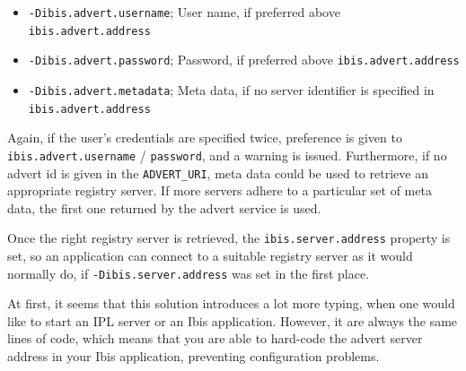\begin{itemize}
  \item \texttt{-Dibis.advert.username}; User name, if preferred above
  	\texttt{ibis.advert.address}
  \item \texttt{-Dibis.advert.password}; Password, if preferred above
  	\texttt{ibis.advert.address} 
  \item \texttt{-Dibis.advert.metadata}; Meta data, if no server identifier is
  	specified in \newline \texttt{ibis.advert.address}
\end{itemize}

Again, if the user's credentials are specified twice, preference is given to
\texttt{ibis.advert.username} / \texttt{password}, and a warning is issued.
Furthermore, if no advert id is given in the \texttt{ADVERT\_URI}, meta data
could be used to retrieve an appropriate registry server. If more servers
adhere to a particular set of meta data, the first one returned by the advert
service is used.

Once the right registry server is retrieved, the \texttt{ibis.server.address}
property is set, so an application can connect to a suitable registry server as
it would normally do, if \texttt{-Dibis.server.address} was set in the first
place.

At first, it seems that this solution introduces a lot more typing, when one
would like to start an IPL server or an Ibis application. However, it are always
the same lines of code, which means that you are able to hard-code the advert
server address in your Ibis application, preventing configuration problems.
